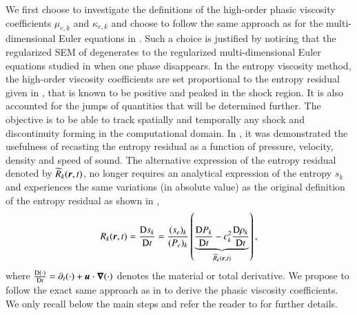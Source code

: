 \documentclass[preprint,10pt]{elsarticle}
\begin{document}
We first choose to investigate the definitions of the high-order phasic viscosity coefficients $\mu_{e,k}$ and $\kappa_{e,k}$ and choose to follow the same approach as for the multi-dimensional Euler equations in \cite{Marco_paper_low_mach}. Such a choice is justified by noticing that the regularized SEM of  degenerates to the regularized multi-dimensional Euler equations studied in \cite{Marco_paper_low_mach} when one phase disappears. In the entropy viscosity method, the high-order viscosity coefficients are set proportional to the entropy residual given in , that is known to be positive and peaked in the shock region. It is also accounted for the jumps of quantities that will be determined further. The objective is to be able to track spatially and temporally any shock and discontinuity forming in the computational domain. In \cite{Marco_paper_low_mach}, it was demonstrated the usefulness of recasting the entropy residual as a function of pressure, velocity, density and speed of sound. The alternative expression of the entropy residual denoted by $\widetilde{R}_k(\boldsymbol r,t)$, no longer requires an analytical expression of the entropy $s_k$ and experiences the same variations (in absolute value) as the original definition of the entropy residual as shown in ,
%
\begin{equation}\label{eq:ent-res-sem}
R_k(\boldsymbol r,t)  = \frac{\textrm{D} s_k}{\textrm{D} t} = \frac{(s_e)_k}{(P_e)_k} \left( \underbrace{\frac{\textrm{D} P_k}{\textrm{D} t} - c_k^2 \frac{\textrm{D} \rho_k}{\textrm{D} t} }_{\widetilde{R}_k(\boldsymbol r,t)} \right) ,
\end{equation} 
%
where $\frac{\textrm{D} (\cdot)}{\textrm{D} t}=\partial_t (\cdot)+\boldsymbol u \cdot \boldsymbol\nabla (\cdot)$ denotes the material or total derivative. We propose to follow the exact same approach as in \cite{Marco_paper_low_mach} to derive the phasic viscosity coefficients. We only recall below the main steps and refer the reader to \cite{Marco_paper_low_mach} for further details.
\end{document}
